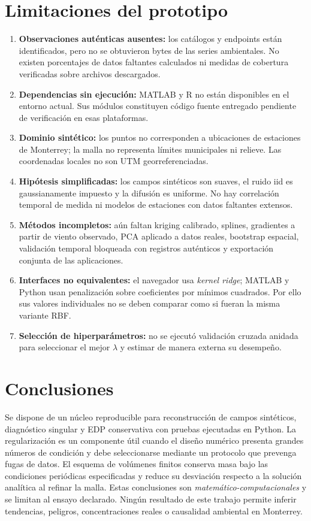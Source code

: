 \section{Limitaciones del prototipo}
\begin{enumerate}
\item \textbf{Observaciones auténticas ausentes:} los catálogos y endpoints están identificados, pero no se obtuvieron bytes de las series ambientales. No existen porcentajes de datos faltantes calculados ni medidas de cobertura verificadas sobre archivos descargados.
\item \textbf{Dependencias sin ejecución:} MATLAB y R no están disponibles en el entorno actual. Sus módulos constituyen código fuente entregado pendiente de verificación en esas plataformas.
\item \textbf{Dominio sintético:} los puntos no corresponden a ubicaciones de estaciones de Monterrey; la malla no representa límites municipales ni relieve. Las coordenadas locales no son UTM georreferenciadas.
\item \textbf{Hipótesis simplificadas:} los campos sintéticos son suaves, el ruido iid es gaussianamente impuesto y la difusión es uniforme. No hay correlación temporal de medida ni modelos de estaciones con datos faltantes extensos.
\item \textbf{Métodos incompletos:} aún faltan kriging calibrado, splines, gradientes a partir de viento observado, PCA aplicado a datos reales, bootstrap espacial, validación temporal bloqueada con registros auténticos y exportación conjunta de las aplicaciones.
\item \textbf{Interfaces no equivalentes:} el navegador usa \emph{kernel ridge}; MATLAB y Python usan penalización sobre coeficientes por mínimos cuadrados. Por ello sus valores individuales no se deben comparar como si fueran la misma variante RBF.
\item \textbf{Selección de hiperparámetros:} no se ejecutó validación cruzada anidada para seleccionar el mejor $\lambda$ y estimar de manera externa su desempeño.
\end{enumerate}

\section{Conclusiones}\label{sec:conclusion}
Se dispone de un núcleo reproducible para reconstrucción de campos sintéticos, diagnóstico singular y EDP conservativa con pruebas ejecutadas en Python. La regularización es un componente útil cuando el diseño numérico presenta grandes números de condición y debe seleccionarse mediante un protocolo que prevenga fugas de datos. El esquema de volúmenes finitos conserva masa bajo las condiciones periódicas especificadas y reduce su desviación respecto a la solución analítica al refinar la malla. Estas conclusiones son \emph{matemático-computacionales} y se limitan al ensayo declarado. Ningún resultado de este trabajo permite inferir tendencias, peligros, concentraciones reales o causalidad ambiental en Monterrey.

